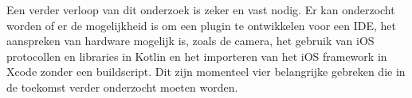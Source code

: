 Een verder verloop van dit onderzoek is zeker en vast nodig. Er kan onderzocht worden of er de mogelijkheid is om een plugin te ontwikkelen voor een IDE, het aanspreken van hardware mogelijk is, zoals de camera, het gebruik van iOS protocollen en libraries in Kotlin en het importeren van het iOS framework in Xcode zonder een buildscript. Dit zijn momenteel vier belangrijke gebreken die in de toekomst verder onderzocht moeten worden.